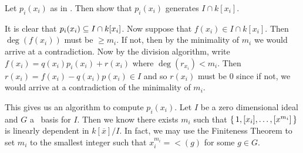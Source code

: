 \documentclass[letterpaper, 11pt, oneside]{book}
\begin{document}
\begin{exercise}\label{ex:UAG_2.2.2}
  Let $p_{i}(x_{i})$ as in \cite[2.2 (2.6)]{book:UAG}.
  Then show that $p_{i}(x_{i})$ generates $I \cap k[x_{i}]$.
\end{exercise}
\begin{pf}
  It is clear that $\ideal{p_{i}(x_{i})} \subseteq I \cap k[x_{i}]$.
  Now suppose that $f(x_{i}) \in I \cap k[x_{i}]$.
  Then $\deg(f(x_{i}))$ must be $\geq m_{i}$.
  If not, then by the minimality of $m_{i}$ we would arrive at a contradiction.
  Now by the division algorithm, write $f(x_{i}) = q(x_{i})p_{i}(x_{i}) + r(x_{i})$ where $\deg(r_{x_{i}}) < m_{i}$.
  Then $r(x_{i}) = f(x_{i}) - q(x_{i})p(x_{i}) \in I$ and so $r(x_{i})$ must be $0$ since if not, we would arrive at a contradiction of the minimality of $m_{i}$.

  This gives us an algorithm to compute $p_{i}(x_{i})$.
  Let $I$ be a zero dimensional ideal and $G$ a \Grobner\ basis for $I$.
  Then we know there exists $m_{i}$ such that $\set{1, [x_{i}], \ldots, [x^{m_{i}}]}$ is linearly dependent in $k[\overline{x}] / I$.
  In fact, we may use the Finiteness Theorem to set $m_{i}$ to the smallest integer such that $x_{i}^{m_{i}} = \lt(g)$ for some $g \in G$.
\end{pf}

\printbibliography
\end{document}

